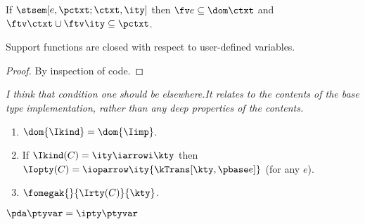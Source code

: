 \begin{lemma}
\label{lem:con-closed-exp}
  If $\stsem[e,\pctxt;\ctxt,\ity]$ then $\fv e \subseteq \dom \ctxt$
  and $\ftv \ctxt \cup \ftv \ity \subseteq \pctxt$.
\end{lemma}

\begin{lemma}
  Support functions are closed with respect to user-defined variables.
\end{lemma}

\begin{proof}
  By inspection of code.
\end{proof}

{\em I think that condition one should be elsewhere.It relates to the
contents of the base type implementation, rather than any deep
properties of the contents.}

\begin{condition}
  \begin{enumerate}
  \item $\dom {\Ikind} = \dom {\Iimp}$.
  \item If $\Ikind(C) = {\ity \iarrowi \kty}$ then $\Iopty(C) =
    \ioparrow \ity {\kTrans[\kty,\pbase e]}$ (for any $e$).
  \item $\fomegak{}{\Irty(C)}{\kty}$.
    \label{cond:closed-op}
  \end{enumerate}
\end{condition}

\begin{definition}
$\pda \ptyvar = \ipty \ptyvar$
\end{definition}

